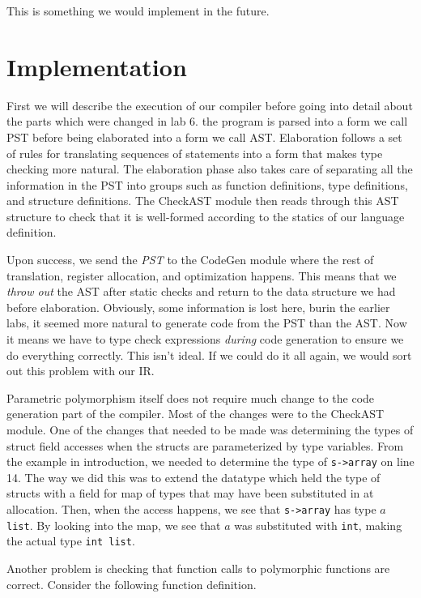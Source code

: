 \documentclass[aps,letterpaper,11pt]{revtex4}
\begin{document}
This is something we would implement in the future.

\newpage
\section{Implementation}

First we will describe the execution of our compiler before going into detail about the parts which were changed
in lab 6. the program is parsed into a form we call PST before being elaborated into a form we call AST. 
Elaboration follows a set of rules for translating sequences of statements into a form that makes type checking
more natural. The elaboration phase also takes care of separating all the information in the PST into groups
such as function definitions, type definitions, and structure definitions. The CheckAST module then reads
through this AST structure to check that it is well-formed according to the statics of our language definition.

Upon success, we send the \emph{PST} to the CodeGen module where the rest of translation, register allocation,
and optimization happens. This means that we \emph{throw out} the AST after static checks and return to
the data structure we had before elaboration. Obviously, some information is lost here, burin the earlier labs,
it seemed more natural to generate code from the PST than the AST. Now it means we have to type check
expressions \emph{during} code generation to ensure we do everything correctly. This isn't ideal. If we could 
do it all again, we would sort out this problem with our IR.

Parametric polymorphism itself does not require much change to the code generation part of the compiler. Most
of the changes were to the CheckAST module. One of the changes that needed to be made was determining the types
of struct field accesses when the structs are parameterized by type variables. From the example in introduction,
we needed to determine the type of \texttt{s->array} on line 14. The way we did this was to extend the datatype
which held the type of structs with a field for map of types that may have been substituted in at allocation.
Then, when the access happens, we see that \texttt{s->array} has type \texttt{$a$ list}. By looking into the
map, we see that $a$ was substituted with \texttt{int}, making the actual type \texttt{int list}.

Another problem is checking that function calls to polymorphic functions are correct. Consider the following function definition.\\
\end{document}
